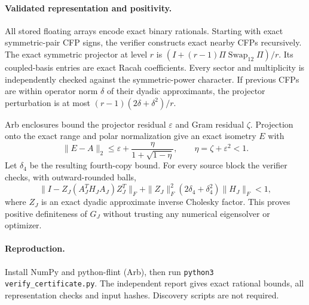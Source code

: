 \documentclass[11pt]{article}
\begin{document}
\paragraph{Validated representation and positivity.}
All stored floating arrays encode exact binary rationals. Starting with exact symmetric-pair CFP signs, the verifier constructs exact nearby CFPs recursively. The exact symmetric projector at level $r$ is $(I+(r-1)\Pi\operatorname{Swap}_{12}\Pi)/r$. Its coupled-basis entries are exact Racah coefficients. Every sector and multiplicity is independently checked against the symmetric-power character. If previous CFPs are within operator norm $\delta$ of their dyadic approximants, the projector perturbation is at most $(r-1)(2\delta+\delta^2)/r$.

Arb enclosures bound the projector residual $\varepsilon$ and Gram residual $\zeta$. Projection onto the exact range and polar normalization give an exact isometry $E$ with
\[
 \|E-A\|_2\le\varepsilon+\frac{\eta}{1+\sqrt{1-\eta}},\qquad\eta=\zeta+\varepsilon^2<1.
\]
Let $\delta_4$ be the resulting fourth-copy bound. For every source block the verifier checks, with outward-rounded balls,
\[
 \|I-Z_J(A_J^TH_JA_J)Z_J^T\|_F+
 \|Z_J\|_F^2(2\delta_4+\delta_4^2)\|H_J\|_F<1,
\]
where $Z_J$ is an exact dyadic approximate inverse Cholesky factor. This proves positive definiteness of $G_J$ without trusting any numerical eigensolver or optimizer.

\paragraph{Reproduction.}Install NumPy and python-flint (Arb), then run \texttt{python3 verify\_certificate.py}. The independent report gives exact rational bounds, all representation checks and input hashes. Discovery scripts are not required.
\end{document}
